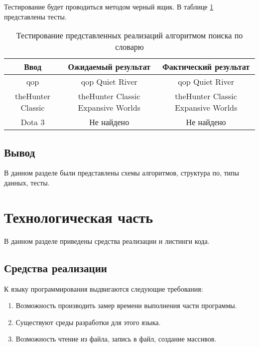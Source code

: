 Тестирование будет проводиться методом черный ящик. В таблице \ref{tab:tests} представлены тесты. \\

\begin{table}[H]
    \caption{Тестирование представленных реализаций алгоритмом поиска по словарю}
    \centering
    \begin{tabular}{|c|c|c|}
    \hline
    Ввод              & Ожидаемый результат                & Фактический результат              \\ \hline
    qop               & qop Quiet River                    & qop Quiet River                    \\ \hline
    theHunter Classic & theHunter Classic Expansive Worlds & theHunter Classic Expansive Worlds \\ \hline
    Dota 3            & Не найдено                         & Не найдено                         \\ \hline
    \end{tabular}
    \label{tab:tests}
\end{table}

\subsection{Вывод}

В данном разделе были представлены схемы алгоритмов, структура по, типы данных, тесты.

\section{Технологическая часть}

В данном разделе приведены средства реализации и листинги кода.

\subsection{Средства реализации}

К языку программирования выдвигаются следующие требования:

\begin{enumerate}
    \item Возможность производить замер времени выполнения части программы.
    \item Существуют среды разработки для этого языка.
    \item Возможность чтение из файла, запись в файл, создание массивов.
\end{enumerate}

